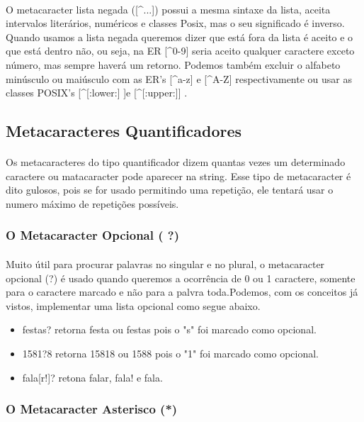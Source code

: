\documentclass[10pt,a4paper]{article}
\newcommand{\circunflexo}{\textasciicircum}
\begin{document}
\paragraph*{}
O metacaracter lista negada ([\circunflexo ...]) possui a mesma sintaxe da lista, aceita intervalos literários, numéricos e classes Posix, mas o seu significado é inverso. Quando usamos a lista negada queremos dizer que está fora da lista é aceito e o que está dentro não, ou seja, na ER [\circunflexo 0-9] seria aceito qualquer caractere exceto número, mas sempre haverá um retorno. Podemos também excluir o alfabeto minúsculo ou maiúsculo com as ER's [\circunflexo a-z] e [\circunflexo A-Z] respectivamente ou usar as classes POSIX's  [\circunflexo[:lower:] ]e [\circunflexo[:upper:]] .
\subsection{ Metacaracteres Quantificadores}
\paragraph*{}
Os metacaracteres do tipo quantificador dizem quantas vezes um determinado caractere ou matacaracter pode aparecer na string. Esse tipo de metacaracter é dito gulosos, pois se for usado permitindo uma repetição, ele tentará usar o numero máximo de repetições possíveis. 
\subsubsection{O Metacaracter Opcional ( ?)}
\paragraph*{}
Muito útil para procurar palavras no singular e no plural, o metacaracter opcional (?) é usado quando queremos a ocorrência de 0 ou 1 caractere, somente para o caractere marcado e não para a palvra toda.Podemos, com os conceitos já vistos, implementar uma lista opcional como segue abaixo.
\begin{itemize}
\item festas? retorna festa ou festas pois o "s" foi marcado como opcional.
\item 1581?8 retorna 15818 ou 1588 pois o "1" foi marcado como opcional.
\item fala[r!]? retona falar, fala! e fala.
\end{itemize}
\subsubsection{O Metacaracter Asterisco (*)}
\end{document}
